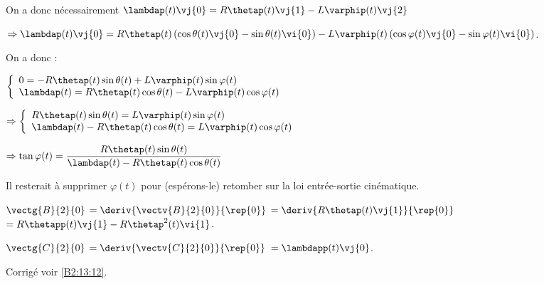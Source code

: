 On a donc nécessairement 
$\lambdap(t) \vj{0}= R\thetap(t) \vj{1} - L\varphip(t)\vj{2}$

$\Rightarrow \lambdap(t) \vj{0}= R\thetap(t) \left( \cos\theta(t)\vj{0}-\sin\theta(t)\vi{0} \right) - L\varphip(t)\left( \cos\varphi(t)\vj{0}-\sin\varphi(t)\vi{0}\right)$.

On a donc :

$
\left\{
\begin{array}{l}
0= -R\thetap(t) \sin\theta(t)  + L\varphip(t)\sin\varphi(t) \\
\lambdap(t) = R\thetap(t)  \cos\theta(t)- L\varphip(t)\cos\varphi(t)
\end{array}
\right.
$

$
\Rightarrow \left\{
\begin{array}{l}
R\thetap(t) \sin\theta(t)  = L\varphip(t)\sin\varphi(t) \\
\lambdap(t) - R\thetap(t)  \cos\theta(t)= L\varphip(t)\cos\varphi(t)
\end{array}
\right.
$

$\Rightarrow 
\tan \varphi(t) = \dfrac{R\thetap(t) \sin\theta(t) }{\lambdap(t) - R\thetap(t)  \cos\theta(t)}
$

Il resterait à supprimer $\varphi(t)$ pour (espérons-le) retomber sur la loi entrée-sortie cinématique.

\else
\fi


\ifprof
$\vectg{B}{2}{0}$
$=\deriv{\vectv{B}{2}{0}}{\rep{0}}$
$=\deriv{R\thetap(t) \vj{1}}{\rep{0}}$
$=R\thetapp(t) \vj{1} - R\thetap^2(t) \vi{1}$.
\else
\fi


\ifprof
$\vectg{C}{2}{0}$
$=\deriv{\vectv{C}{2}{0}}{\rep{0}}$
$=\lambdapp(t) \vj{0} $.
\else
\fi


\ifprof
\else
\begin{flushright}
\footnotesize{Corrigé  voir \ref{B2:13:12}.}
\end{flushright}%
\fi